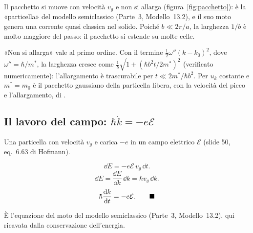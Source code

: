 \documentclass[11pt,a4paper]{article}
\begin{document}
\begin{interpretazione}
Il pacchetto si muove con velocità $v_g$ e non si allarga (figura~\ref{fig:pacchetto}): è la «particella» del modello semiclassico (Parte~3,
Modello~13.2), e il suo moto genera una corrente quasi classica nel solido. Poiché $b\ll2\pi/a$, la larghezza $1/b$ è molto maggiore del passo: il
pacchetto si estende su molte celle.
\end{interpretazione}
\begin{osservazione}
«Non si allarga» vale al primo ordine. Con il termine $\frac12\omega''(k-k_0)^2$, dove $\omega''=\hbar/m^*$, la larghezza cresce come
$\frac1b\sqrt{1+(\hbar b^2t/2m^*)^2}$ (verificato numericamente): l'allargamento è trascurabile per $t\ll2m^*/\hbar b^2$. Per $u_k$ costante e
$m^*=m_0$ è il pacchetto gaussiano della particella libera, con la velocità del picco e l'allargamento, di .
\end{osservazione}

\subsection{Il lavoro del campo: $\hbar\dot k=-e\mathcal E$}
Una particella con velocità $v_g$ e carica $-e$ in un campo elettrico $\mathcal E$ (slide 50, eq.~6.63 di Hofmann).
\begin{dimostrazione}
\[
\dd E=-e\mathcal E\,v_g\,\dd t .
\]
\[
\dd E=\frac{\dd E}{\dd k}\,\dd k=\hbar v_g\,\dd k .
\]
\[
\hbar\frac{\dd k}{\dd t}=-e\mathcal E .\qed
\]
\end{dimostrazione}
È l'equazione del moto del modello semiclassico (Parte~3, Modello~13.2), qui ricavata dalla conservazione dell'energia.
\end{document}
